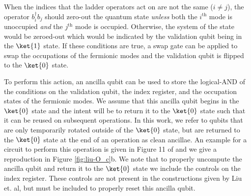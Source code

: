 When the indices that the ladder operators act on are not the same ($i \neq j$), the operator $b_i^\dagger b_j$ should zero-out the quantum state \textit{unless} both the $i^\text{th}$ mode is unoccupied \textit{and} the $j^\text{th}$ mode is occupied.
Otherwise, the system of the state would be zeroed-out which would be indicated by the validation qubit being in the $\ket{1}$ state.
If these conditions are true, a swap gate can be applied to swap the occupations of the fermionic modes and the validation qubit is flipped to the $\ket{0}$ state. 

To perform this action, an ancilla qubit can be used to store the logical-AND of the conditions on the validation qubit, the index register, and the occupation states of the fermionic modes.
We assume that this ancilla qubit begins in the $\ket{0}$ state and the intent will be to return it to the $\ket{0}$ state such that it can be reused on subsequent operations.
In this work, we refer to qubits that are only temporarily rotated outside of the $\ket{0}$ state, but are returned to the $\ket{0}$ state at the end of an operation as clean ancillae.
An example for a circuit to perform this operation is given in Figure 11 of \cite{liu2024efficient} and we give a reproduction in Figure \ref{fig:liu-O_c}b.
We note that to properly uncompute the ancilla qubit and return it to the $\ket{0}$ state we include the controls on the index register.
These controls are not present in the constructions given by Liu et. al, but must be included to properly reset this ancilla qubit.
